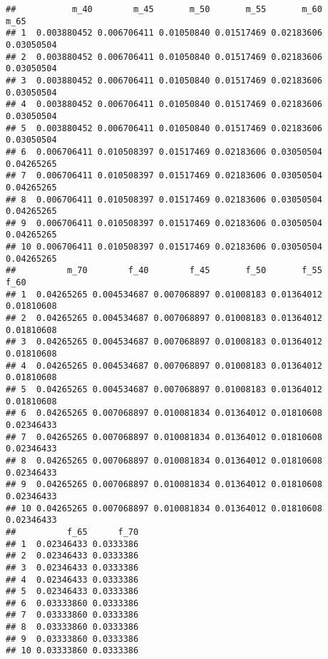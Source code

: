 \documentclass[
]{article}
\begin{document}
\begin{verbatim}
##           m_40        m_45       m_50       m_55       m_60       m_65
## 1  0.003880452 0.006706411 0.01050840 0.01517469 0.02183606 0.03050504
## 2  0.003880452 0.006706411 0.01050840 0.01517469 0.02183606 0.03050504
## 3  0.003880452 0.006706411 0.01050840 0.01517469 0.02183606 0.03050504
## 4  0.003880452 0.006706411 0.01050840 0.01517469 0.02183606 0.03050504
## 5  0.003880452 0.006706411 0.01050840 0.01517469 0.02183606 0.03050504
## 6  0.006706411 0.010508397 0.01517469 0.02183606 0.03050504 0.04265265
## 7  0.006706411 0.010508397 0.01517469 0.02183606 0.03050504 0.04265265
## 8  0.006706411 0.010508397 0.01517469 0.02183606 0.03050504 0.04265265
## 9  0.006706411 0.010508397 0.01517469 0.02183606 0.03050504 0.04265265
## 10 0.006706411 0.010508397 0.01517469 0.02183606 0.03050504 0.04265265
##          m_70        f_40        f_45       f_50       f_55       f_60
## 1  0.04265265 0.004534687 0.007068897 0.01008183 0.01364012 0.01810608
## 2  0.04265265 0.004534687 0.007068897 0.01008183 0.01364012 0.01810608
## 3  0.04265265 0.004534687 0.007068897 0.01008183 0.01364012 0.01810608
## 4  0.04265265 0.004534687 0.007068897 0.01008183 0.01364012 0.01810608
## 5  0.04265265 0.004534687 0.007068897 0.01008183 0.01364012 0.01810608
## 6  0.04265265 0.007068897 0.010081834 0.01364012 0.01810608 0.02346433
## 7  0.04265265 0.007068897 0.010081834 0.01364012 0.01810608 0.02346433
## 8  0.04265265 0.007068897 0.010081834 0.01364012 0.01810608 0.02346433
## 9  0.04265265 0.007068897 0.010081834 0.01364012 0.01810608 0.02346433
## 10 0.04265265 0.007068897 0.010081834 0.01364012 0.01810608 0.02346433
##          f_65      f_70
## 1  0.02346433 0.0333386
## 2  0.02346433 0.0333386
## 3  0.02346433 0.0333386
## 4  0.02346433 0.0333386
## 5  0.02346433 0.0333386
## 6  0.03333860 0.0333386
## 7  0.03333860 0.0333386
## 8  0.03333860 0.0333386
## 9  0.03333860 0.0333386
## 10 0.03333860 0.0333386
\end{verbatim}
\end{document}
